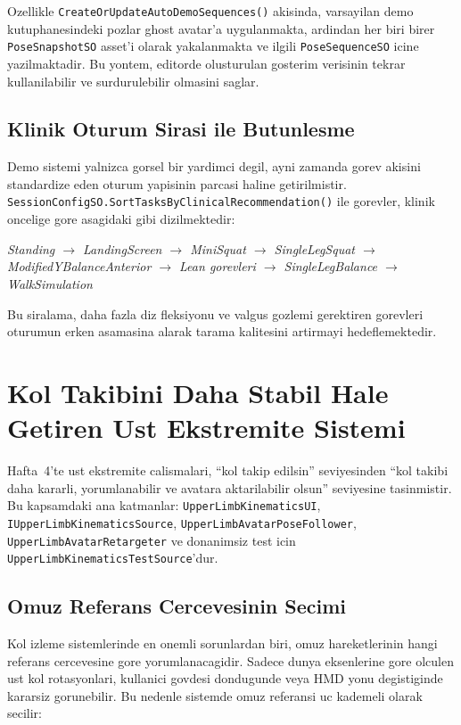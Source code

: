 \documentclass[11pt,a4paper]{article}
\begin{document}
Ozellikle \texttt{CreateOrUpdateAutoDemoSequences()} akisinda,
varsayilan demo kutuphanesindeki pozlar ghost avatar'a uygulanmakta,
ardindan her biri birer \texttt{PoseSnapshotSO} asset'i olarak yakalanmakta
ve ilgili \texttt{PoseSequenceSO} icine yazilmaktadir. Bu yontem, editorde
olusturulan gosterim verisinin tekrar kullanilabilir ve surdurulebilir
olmasini saglar.

\subsection{Klinik Oturum Sirasi ile Butunlesme}

Demo sistemi yalnizca gorsel bir yardimci degil, ayni zamanda gorev akisini
standardize eden oturum yapisinin parcasi haline getirilmistir.
\texttt{SessionConfigSO.SortTasksByClinicalRecommendation()} ile gorevler,
klinik oncelige gore asagidaki gibi dizilmektedir:

\begin{center}
\textit{Standing $\rightarrow$ LandingScreen $\rightarrow$ MiniSquat
$\rightarrow$ SingleLegSquat $\rightarrow$ ModifiedYBalanceAnterior
$\rightarrow$ Lean gorevleri $\rightarrow$ SingleLegBalance
$\rightarrow$ WalkSimulation}
\end{center}

Bu siralama, daha fazla diz fleksiyonu ve valgus gozlemi gerektiren
gorevleri oturumun erken asamasina alarak tarama kalitesini artirmayi
hedeflemektedir.

\section{Kol Takibini Daha Stabil Hale Getiren Ust Ekstremite Sistemi}
\label{sec:arm}

Hafta~4'te ust ekstremite calismalari, ``kol takip edilsin'' seviyesinden
``kol takibi daha kararli, yorumlanabilir ve avatara aktarilabilir
olsun'' seviyesine tasinmistir. Bu kapsamdaki ana katmanlar:
\texttt{UpperLimbKinematicsUI}, \texttt{IUpperLimbKinematicsSource},
\texttt{UpperLimbAvatarPoseFollower}, \texttt{UpperLimbAvatarRetargeter}
ve donanimsiz test icin \texttt{UpperLimbKinematicsTestSource}'dur.

\subsection{Omuz Referans Cercevesinin Secimi}

Kol izleme sistemlerinde en onemli sorunlardan biri, omuz hareketlerinin hangi
referans cercevesine gore yorumlanacagidir. Sadece dunya eksenlerine gore
olculen ust kol rotasyonlari, kullanici govdesi dondugunde veya HMD yonu
degistiginde kararsiz gorunebilir. Bu nedenle sistemde omuz referansi uc kademeli
olarak secilir:
\end{document}
